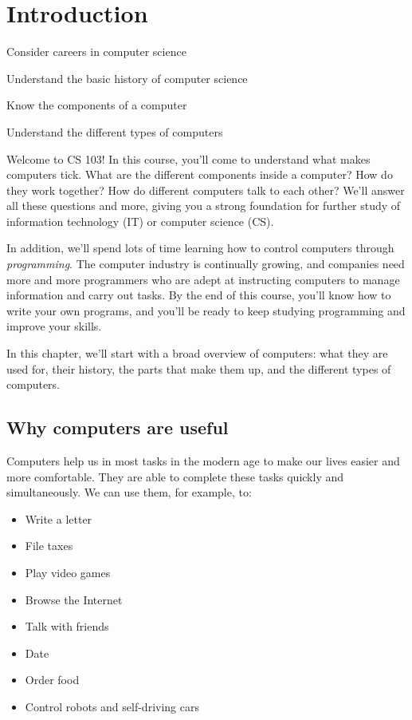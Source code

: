 \chapter{Introduction}\label{chap:intro}

\begin{goals}
\item Consider careers in computer science
\item Understand the basic history of computer science
\item Know the components of a computer
\item Understand the different types of computers
\end{goals}

Welcome to CS 103! In this course, you'll come to understand what makes computers tick. What are the different components inside a computer? How do they work together? How do different computers talk to each other? We'll answer all these questions and more, giving you a strong foundation for further study of information technology (IT) or computer science (CS). 

In addition, we'll spend lots of time learning how to control computers through \emph{programming}. The computer industry is continually growing, and companies need more and more programmers who are adept at instructing computers to manage information and carry out tasks. By the end of this course, you'll know how to write your own programs, and you'll be ready to keep studying programming and improve your skills.

In this chapter, we'll start with a broad overview of computers: what they are used for, their history, the parts that make them up, and the different types of computers.

\section{Why computers are useful}

Computers help us in most tasks in the modern age to make our lives easier and more comfortable. They are able to complete these tasks quickly and simultaneously. We can use them, for example, to:

\begin{itemize}
	\item Write a letter
	\item File taxes
	\item Play video games
	\item Browse the Internet
	\item Talk with friends
	\item Date
	\item Order food
	\item Control robots and self-driving cars
\end{itemize}

